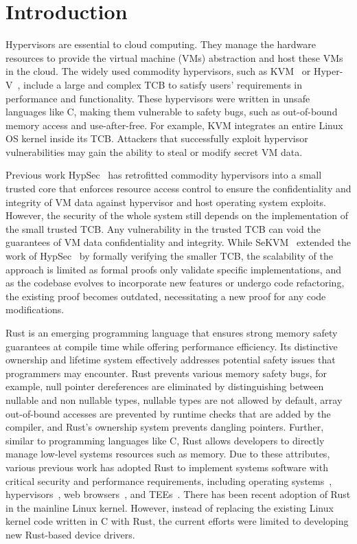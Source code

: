 
\chapter{Introduction}

Hypervisors are essential to cloud computing. They manage the hardware
resources to provide the virtual machine (VMs) abstraction and host
these VMs in the cloud.
The widely used commodity
hypervisors, such as KVM~\cite{kivity07kvm} or Hyper-V~\cite{hyperv},
include a large and complex TCB to satisfy users' requirements in
performance and functionality. These hypervisors were written in unsafe
languages like C, making them vulnerable to safety bugs, such as
out-of-bound memory access and use-after-free. For example, KVM
integrates an entire Linux OS kernel inside its TCB. Attackers that
successfully exploit hypervisor vulnerabilities may gain the ability
to steal or modify secret VM data.

Previous work HypSec~\cite{hypsec} has retrofitted commodity hypervisors into a
small trusted core that enforces resource access control to ensure the
confidentiality and integrity of VM data against hypervisor and host operating
system exploits. However, the security of the whole system still depends on the
implementation of the small trusted TCB. Any vulnerability in the trusted TCB
can void the guarantees of VM data confidentiality and integrity.
While SeKVM~\cite{sekvm} extended the work of HypSec~\cite{hypsec} by formally
verifying the smaller TCB, the scalability of the approach is limited as formal
proofs only validate specific implementations, and as the codebase evolves to
incorporate new features or undergo code refactoring, the existing proof
becomes outdated, necessitating a new proof for any code modifications.

Rust is an emerging programming language that ensures strong memory safety
guarantees at compile time while offering performance efficiency.
Its distinctive ownership and lifetime system
effectively addresses potential safety issues that programmers may encounter.
Rust prevents various memory safety bugs, for example, null pointer
dereferences are eliminated by distinguishing between nullable and non
nullable types, nullable types are not allowed by default, array out-of-bound
accesses are prevented by runtime checks that are added by the compiler, and
Rust's ownership system prevents dangling pointers.
Further, similar to programming languages like C, Rust allows developers to
directly manage low-level systems resources such as memory. Due to these
attributes, various previous work has adopted Rust to implement systems
software with critical security and performance requirements, including
operating systems~\cite{NrOS, Redleaf, TockOS, theseus},
hypervisors~\cite{DuVisor, RustyHermit}, web browsers~\cite{servo},
and TEEs~\cite{rustsgx,rustee}.
There has been recent adoption of Rust in the mainline Linux kernel. However,
instead of replacing the existing Linux kernel code written in C with Rust,
the current efforts were limited to developing new Rust-based device drivers.

